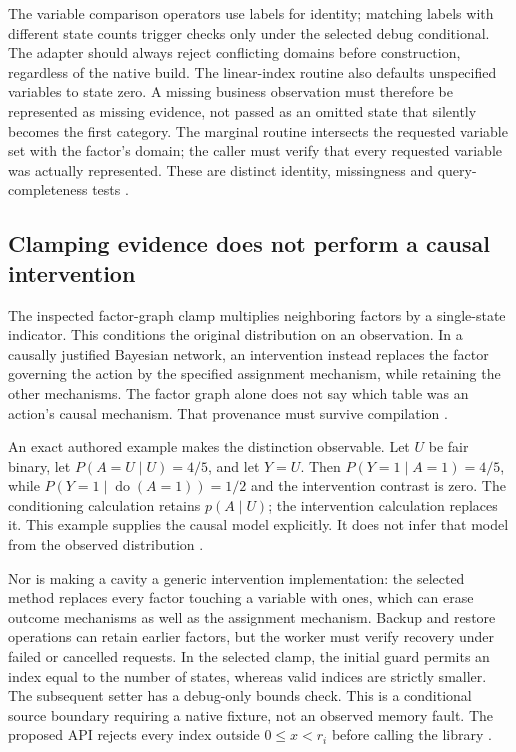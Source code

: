 The variable comparison operators use labels for identity; matching labels
with different state counts trigger checks only under the selected debug
conditional. The adapter should always reject conflicting domains before
construction, regardless of the native build. The linear-index routine also
defaults unspecified variables to state zero. A missing business observation
must therefore be represented as missing evidence, not passed as an omitted
state that silently becomes the first category. The marginal routine
intersects the requested variable set with the factor's domain; the caller
must verify that every requested variable was actually represented. These
are distinct identity, missingness and query-completeness tests
\citep{exec24_libdai_source}.

\subsection{Clamping evidence does not perform a causal intervention}
The inspected factor-graph clamp multiplies neighboring factors by a
single-state indicator. This conditions the original distribution on an
observation. In a causally justified Bayesian network, an intervention
instead replaces the factor governing the action by the specified assignment
mechanism, while retaining the other mechanisms. The factor graph alone
does not say which table was an action's causal mechanism. That provenance
must survive compilation \citep{exec24_libdai_source,exec24_libdai_choice}.

An exact authored example makes the distinction observable. Let $U$ be fair
binary, let $P(A=U\mid U)=4/5$, and let $Y=U$. Then
$P(Y=1\mid A=1)=4/5$, while
$P(Y=1\mid\operatorname{do}(A=1))=1/2$ and the intervention contrast is zero.
The conditioning calculation retains $p(A\mid U)$; the intervention
calculation replaces it. This example supplies the causal model explicitly.
It does not infer that model from the observed distribution
\citep{exec24_libdai_choice}.

Nor is making a cavity a generic intervention implementation: the selected
method replaces every factor touching a variable with ones, which can erase
outcome mechanisms as well as the assignment mechanism. Backup and restore
operations can retain earlier factors, but the worker must verify recovery
under failed or cancelled requests. In the selected clamp, the initial
guard permits an index equal to the number of states, whereas valid indices
are strictly smaller. The subsequent setter has a debug-only bounds check.
This is a conditional source boundary requiring a native fixture, not an
observed memory fault. The proposed API rejects every index outside
$0\leq x<r_i$ before calling the library
\citep{exec24_libdai_source,exec24_libdai_choice}.


